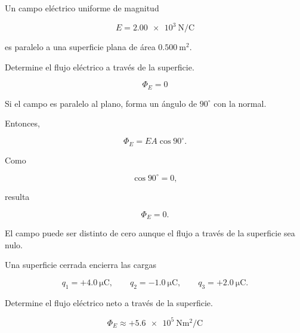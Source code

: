 \begin{ejercicio}

Un campo eléctrico uniforme de magnitud

\[
E=\SI{2.00e3}{\newton\per\coulomb}
\]

es paralelo a una superficie plana de área \(\SI{0.500}{\metre\squared}\).

Determine el flujo eléctrico a través de la superficie.

\end{ejercicio}

\begin{respuesta}

\[
\boxed{\Phi_E=0}
\]

\end{respuesta}

\begin{explicacion}

Si el campo es paralelo al plano, forma un ángulo de \(90^\circ\) con la normal.

Entonces,

\[
\Phi_E=EA\cos90^\circ.
\]

Como

\[
\cos90^\circ=0,
\]

resulta

\[
\boxed{\Phi_E=0}.
\]

El campo puede ser distinto de cero aunque el flujo a través de la superficie sea
nulo.

\end{explicacion}


\begin{ejercicio}

Una superficie cerrada encierra las cargas

\[
q_1=+\SI{4.0}{\micro\coulomb},\qquad
q_2=-\SI{1.0}{\micro\coulomb},\qquad
q_3=+\SI{2.0}{\micro\coulomb}.
\]

Determine el flujo eléctrico neto a través de la superficie.

\end{ejercicio}

\begin{respuesta}

\[
\boxed{
\Phi_E\approx+\SI{5.6e5}{\newton\metre\squared\per\coulomb}
}
\]

\end{respuesta}

